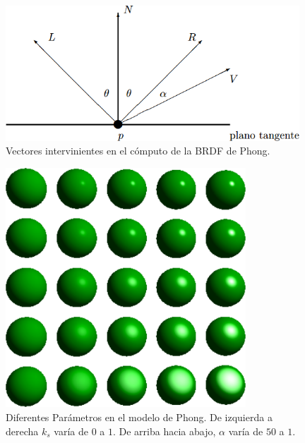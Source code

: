 \begin{figure}
\center
\includegraphics[width=11cm]{figures/phongVecs}
\caption{Vectores intervinientes en el cómputo de la BRDF de Phong.}
\label{fg:phongVecs}
\end{figure}

\begin{figure}
\center
\includegraphics[width=9cm]{figures/phongparametros}
\caption{Diferentes Parámetros en el modelo de Phong. De izquierda a derecha $k_{s}$ varía de $0$ a $1$. De arriba hacia abajo, $\alpha$ varía de $50$ a $1$.}
\label{fg:phongparametros}
\end{figure}



$$$$



